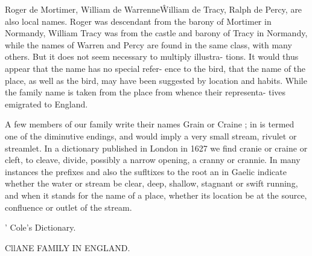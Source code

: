 \documentclass{book}
\begin{document}
Roger de Mortimer, William de Warrenne\^ William de Tracy, 
Ralph de Percy, are also local names. Roger was descendant 
from the barony of Mortimer in Normandy, William Tracy was 
from the castle and barony of Tracy in Normandy, while the 
names of Warren and Percy are found in the same class, with 
many others. But it does not seem necessary to multiply illustra- 
tions. It would thus appear that the name has no special refer- 
ence to the bird, that the name of the place, as well as the bird, 
may have been suggested by location and habits. While the 
family name is taken from the place from whence their representa- 
tives emigrated to England. 

A few members of our family write their names Grain or 
Craine ; in is termed one of the diminutive endings, and would 
imply a very small stream, rivulet or streamlet. In a dictionary 
published in London in 1627 we find cranie or craine or cleft, 
to cleave, divide, possibly a narrow opening, a cranny or crannie. 
In many instances the prefixes and also the sufltixes to the root 
an in Gaelic indicate whether the water or stream be clear, deep, 
shallow, stagnant or swift running, and when it stands for the 
name of a place, whether its location be at the source, confluence 
or outlet of the stream. 



' Cole's Dictionary. 



CllANE FAMILY IN ENGLAND. 
\end{document}
